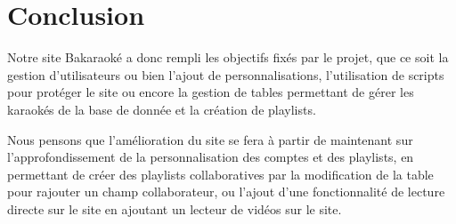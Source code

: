 \section{Conclusion}
Notre site Bakaraoké a donc rempli les objectifs fixés par le projet, que ce soit la gestion d'utilisateurs
ou bien l'ajout de personnalisations, l'utilisation de scripts pour protéger le site ou encore la gestion
de tables permettant de gérer les karaokés de la base de donnée et la création de playlists.

Nous pensons que l'amélioration du site se fera à partir de maintenant sur l'approfondissement de la personnalisation des comptes
et des playlists, en permettant de créer des playlists collaboratives par la modification de la table pour rajouter un champ collaborateur,
ou l'ajout d'une fonctionnalité de lecture directe sur le site en ajoutant un lecteur de vidéos sur le site.
